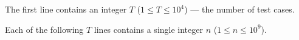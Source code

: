 The first line contains an integer $T$ ($1 \le T \le 10^4$) --- the number of test cases.\

Each of the following $T$ lines contains a single integer $n$ ($1 \le n \le 10^9$).